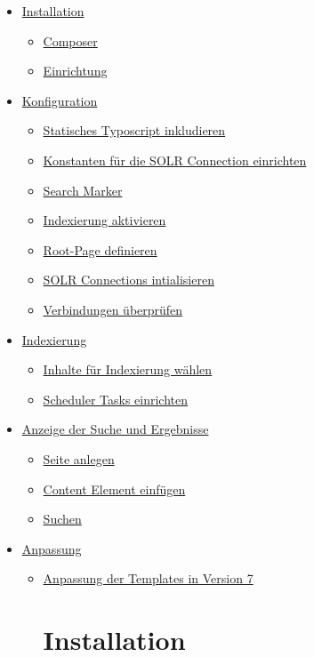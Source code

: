 \documentclass[]{book}
\date{}
\providecommand{\tightlist}{%
  \setlength{\itemsep}{0pt}\setlength{\parskip}{0pt}}
\begin{document}
\begin{itemize}
\tightlist
\item
  \protect\hyperlink{page1}{Installation}

  \begin{itemize}
  \tightlist
  \item
    \protect\hyperlink{part1}{Composer}
  \item
    \protect\hyperlink{part2}{Einrichtung}
  \end{itemize}
\item
  \protect\hyperlink{page2}{Konfiguration}

  \begin{itemize}
  \tightlist
  \item
    \protect\hyperlink{part3}{Statisches Typoscript inkludieren}
  \item
    \protect\hyperlink{part4}{Konstanten für die SOLR Connection
    einrichten}
  \item
    \protect\hyperlink{part5}{Search Marker}
  \item
    \protect\hyperlink{part6}{Indexierung aktivieren}
  \item
    \protect\hyperlink{part7}{Root-Page definieren}
  \item
    \protect\hyperlink{part8}{SOLR Connections intialisieren}
  \item
    \protect\hyperlink{part9}{Verbindungen überprüfen}
  \end{itemize}
\item
  \protect\hyperlink{page3}{Indexierung}

  \begin{itemize}
  \tightlist
  \item
    \protect\hyperlink{part10}{Inhalte für Indexierung wählen}
  \item
    \protect\hyperlink{part11}{Scheduler Tasks einrichten}
  \end{itemize}
\item
  \protect\hyperlink{page4}{Anzeige der Suche und Ergebnisse}

  \begin{itemize}
  \tightlist
  \item
    \protect\hyperlink{part12}{Seite anlegen}
  \item
    \protect\hyperlink{part13}{Content Element einfügen}
  \item
    \protect\hyperlink{part14}{Suchen}
  \end{itemize}
\item
  \protect\hyperlink{page5}{Anpassung}

  \begin{itemize}
  \item
    \protect\hyperlink{part15}{Anpassung der Templates in Version 7}

    \chapter{Installation}
  \end{itemize}
\end{itemize}
\end{document}
